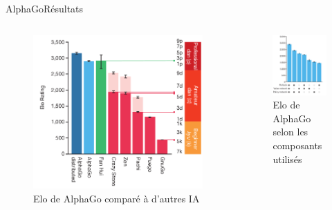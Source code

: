 \begin{frame}{AlphaGo}{Résultats}
    \begin{columns}[t]
        \begin{column}{.4\textwidth}
            \vspace{-1.5cm}
            \begin{figure}
                \includegraphics[scale=0.3]{ressources/AlphaGo/AlphaGovsShit.png}
                Elo de AlphaGo comparé à d'autres IA
            \end{figure}
        \end{column}
        \begin{column}{.4\textwidth}
            \begin{figure}
                \includegraphics[scale=0.3]{ressources/AlphaGo/comparaison_different_models}
                \\
                Elo de AlphaGo selon les composants utilisés
            \end{figure}
        \end{column}
    \end{columns}
\end{frame}
